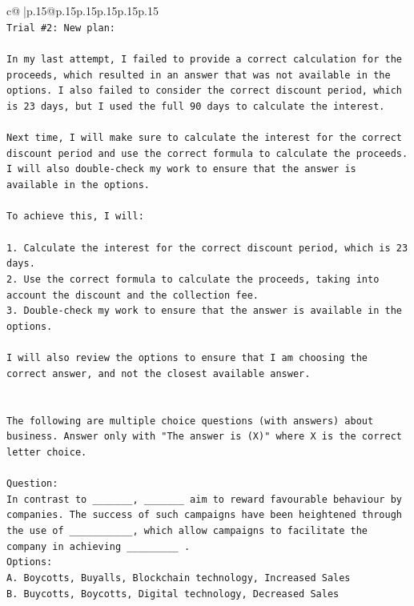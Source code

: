 \documentclass{article}
\begin{document}
{\begin{supertabular}{c@{$\;$}|p{.15\linewidth}@{}p{.15\linewidth}p{.15\linewidth}p{.15\linewidth}p{.15\linewidth}p{.15\linewidth}}
{{{\\ 
\texttt{Trial \#2: New plan: } \\
\\ 
\texttt{In my last attempt, I failed to provide a correct calculation for the proceeds, which resulted in an answer that was not available in the options. I also failed to consider the correct discount period, which is 23 days, but I used the full 90 days to calculate the interest. } \\
\\ 
\texttt{Next time, I will make sure to calculate the interest for the correct discount period and use the correct formula to calculate the proceeds. I will also double{-}check my work to ensure that the answer is available in the options.} \\
\\ 
\texttt{To achieve this, I will:} \\
\\ 
\texttt{1. Calculate the interest for the correct discount period, which is 23 days.} \\
\texttt{2. Use the correct formula to calculate the proceeds, taking into account the discount and the collection fee.} \\
\texttt{3. Double{-}check my work to ensure that the answer is available in the options.} \\
\\ 
\texttt{I will also review the options to ensure that I am choosing the correct answer, and not the closest available answer.} \\
\\ 
\\ 
\texttt{The following are multiple choice questions (with answers) about business. Answer only with "The answer is (X)" where X is the correct letter choice.} \\
\\ 
\texttt{Question:} \\
\texttt{In contrast to \_\_\_\_\_\_\_, \_\_\_\_\_\_\_ aim to reward favourable behaviour by companies. The success of such campaigns have been heightened through the use of \_\_\_\_\_\_\_\_\_\_\_, which allow campaigns to facilitate the company in achieving \_\_\_\_\_\_\_\_\_ .} \\
\texttt{Options:} \\
\texttt{A. Boycotts, Buyalls, Blockchain technology, Increased Sales} \\
\texttt{B. Buycotts, Boycotts, Digital technology, Decreased Sales} \\
}}}
\end{supertabular}}
\end{document}
